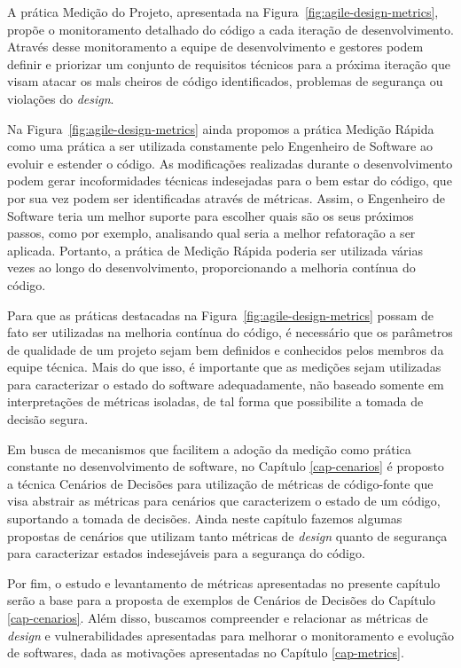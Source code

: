 %

A prática Medição do Projeto, apresentada na Figura~\ref{fig:agile-design-metrics}, propõe o monitoramento detalhado do código a cada iteração de desenvolvimento. Através desse monitoramento a equipe de desenvolvimento e gestores podem definir e priorizar um conjunto de requisitos técnicos para a próxima iteração que visam atacar os mals cheiros de código identificados, problemas de segurança ou violações do \emph{design}.

%

Na Figura~\ref{fig:agile-design-metrics} ainda propomos a prática Medição Rápida como uma prática a ser utilizada constamente pelo Engenheiro de Software ao evoluir e estender o código. As modificações realizadas durante o desenvolvimento podem gerar incoformidades técnicas indesejadas para o bem estar do código, que por sua vez podem ser identificadas através de métricas. Assim, o Engenheiro de Software teria um melhor suporte para escolher quais são os seus próximos passos, como por exemplo, analisando qual seria a melhor refatoração a ser aplicada. Portanto, a prática de Medição Rápida poderia ser utilizada várias vezes ao longo do desenvolvimento, proporcionando a melhoria contínua do código.

%

Para que as práticas destacadas na Figura~\ref{fig:agile-design-metrics} possam de fato ser utilizadas na melhoria contínua do código, é necessário que os parâmetros de qualidade de um projeto sejam bem definidos e conhecidos pelos membros da equipe técnica. Mais do que isso, é importante que as medições sejam utilizadas para caracterizar o estado do software adequadamente, não baseado somente em interpretações de métricas isoladas, de tal forma que possibilite a tomada de decisão segura.

%


Em busca de mecanismos que facilitem a adoção da medição como prática constante no desenvolvimento de software, no Capítulo \ref{cap-cenarios} é proposto a técnica Cenários de Decisões para utilização de métricas de código-fonte que visa abstrair as métricas para cenários que caracterizem o estado de um código, suportando a tomada de decisões. Ainda neste capítulo fazemos algumas propostas de cenários que utilizam tanto métricas de \emph{design} quanto de segurança para caracterizar estados indesejáveis para a segurança do código.

%

Por fim, o estudo e levantamento de métricas apresentadas no presente capítulo serão a base para a proposta de exemplos de Cenários de Decisões do Capítulo \ref{cap-cenarios}. Além disso, buscamos compreender e relacionar as métricas de \emph{design} e vulnerabilidades apresentadas para melhorar o monitoramento e evolução de softwares, dada as motivações apresentadas no Capítulo \ref{cap-metrics}.

%
